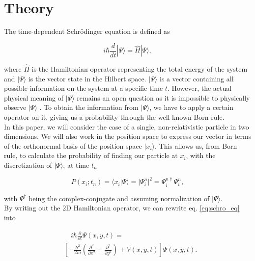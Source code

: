 \documentclass[english,notitlepage,reprint,nofootinbib]{revtex4-2}  %
\begin{document}
	\section{Theory} \label{sec:theory}
	The time-dependent Schrödinger equation is defined as

	\begin{equation}
	i \hbar \frac{d}{d t}|\Psi\rangle=\hat{H}|\Psi\rangle \label{eq:schro_eq},
	\end{equation}

	\noindent
	where $\hat{H}$ is the Hamiltonian operator representing the total energy of the system
	and $|\Psi\rangle$ is the vector state in the Hilbert space. $|\Psi\rangle$ is a vector
	containing all possible information on the system at a specific time $t$. However, the actual physical meaning of $|\Psi\rangle$ remains an open question as it is impossible to
	physically observe $|\Psi\rangle$ \cite{griffiths:quantumn}. To obtain the information
	from $|\Psi\rangle$, we have to apply a certain operator on it, giving us a probability
	through the well known Born rule.\\

	\noindent
	In this paper, we will consider the case of a single, non-relativistic particle in two dimensions.
	We will also work in the position space to express our vector
	in terms of the orthonormal basis of the position space $|x_i\rangle$. This allows us, from Born rule, to calculate the probability of finding our particle at
	$x_i$, with the discretization of  $|\Psi\rangle$,  at time $t_n$

	\begin{equation}
		P(x_i;t_n) = \langle x_i |\Psi\rangle = |\Psi^n_i|^2 =  \Psi^{n\dagger}_i\Psi^n_i,
	\end{equation}

	\noindent
	with $\Psi^\dagger$ being the complex-conjugate and assuming normalization of $
	|\Psi\rangle$. \\

	\noindent
	By writing out the 2D Hamiltonian operator, we can rewrite eq. \ref{eq:schro_eq} into


	\begin{align*}
		& \quad i \hbar \frac{\partial}{\partial t} \Psi(x, y, t)= \\
		& \left[-\frac{\hbar^{2}}{2 m}\left(\frac{\partial^{2}}{\partial x^{2}}+\frac{\partial^{2}}{\partial y^{2}}\right)+V(x, y, t)\right] \Psi(x, y, t) \tag{2}. \label{eq:explicit_scho}
	\end{align*}
\end{document}
